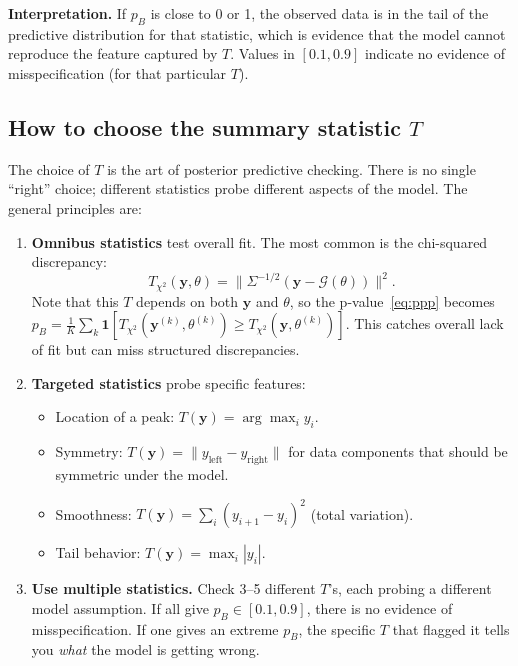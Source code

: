 \documentclass[11pt]{article}
\newcommand{\cG}{\mathcal{G}}
\theoremstyle{plain}
\theoremstyle{remark}
\theoremstyle{definition}
\begin{document}
\noindent\textbf{Interpretation.} If $p_B$ is close to 0 or 1, the observed 
data is in the tail of the predictive distribution for that statistic, which 
is evidence that the model cannot reproduce the feature captured by $T$. 
Values in $[0.1, 0.9]$ indicate no evidence of misspecification (for that 
particular $T$).

\subsection{How to choose the summary statistic $T$}

The choice of $T$ is the art of posterior predictive checking. There is no 
single ``right'' choice; different statistics probe different aspects of the 
model. The general principles are:
\begin{enumerate}[label=(\alph*)]
\item \textbf{Omnibus statistics} test overall fit. The most common is the 
  chi-squared discrepancy:
  \begin{equation}\label{eq:T_chi2}
  T_{\chi^2}(\mathbf{y}, \theta) 
  = \|\Sigma^{-1/2}(\mathbf{y} - \cG(\theta))\|^2.
  \end{equation}
  Note that this $T$ depends on both $\mathbf{y}$ and $\theta$, so the 
  p-value~\eqref{eq:ppp} becomes
  $p_B = \frac{1}{K}\sum_k \mathbf{1}[T_{\chi^2}(\mathbf{y}^{(k)}, 
  \theta^{(k)}) \geq T_{\chi^2}(\mathbf{y}, \theta^{(k)})]$.
  This catches overall lack of fit but can miss structured discrepancies.

\item \textbf{Targeted statistics} probe specific features:
  \begin{itemize}
  \item Location of a peak: $T(\mathbf{y}) = \arg\max_i y_i$.
  \item Symmetry: $T(\mathbf{y}) = \|y_{\text{left}} - y_{\text{right}}\|$ 
    for data components that should be symmetric under the model.
  \item Smoothness: $T(\mathbf{y}) = \sum_i (y_{i+1} - y_i)^2$ (total 
    variation).
  \item Tail behavior: $T(\mathbf{y}) = \max_i |y_i|$.
  \end{itemize}

\item \textbf{Use multiple statistics.} Check 3--5 different $T$'s, each 
  probing a different model assumption. If all give $p_B \in [0.1, 0.9]$, 
  there is no evidence of misspecification. If one gives an extreme $p_B$, 
  the specific $T$ that flagged it tells you \emph{what} the model is 
  getting wrong.
\end{enumerate}
\end{document}
